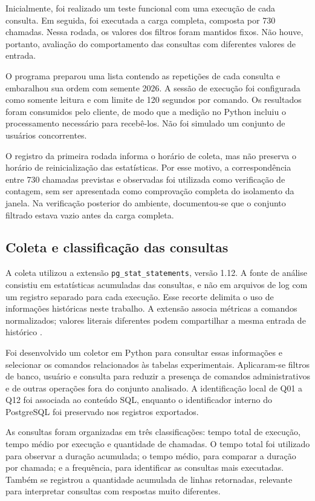 \documentclass{UNESC}
\begin{document}
Inicialmente, foi realizado um teste funcional com uma execução de cada consulta. Em seguida, foi executada a carga completa, composta por 730 chamadas. Nessa rodada, os valores dos filtros foram mantidos fixos. Não houve, portanto, avaliação do comportamento das consultas com diferentes valores de entrada.

O programa preparou uma lista contendo as repetições de cada consulta e embaralhou sua ordem com semente 2026. A sessão de execução foi configurada como somente leitura e com limite de 120 segundos por comando. Os resultados foram consumidos pelo cliente, de modo que a medição no Python incluiu o processamento necessário para recebê-los. Não foi simulado um conjunto de usuários concorrentes.

O registro da primeira rodada informa o horário de coleta, mas não preserva o horário de reinicialização das estatísticas. Por esse motivo, a correspondência entre 730 chamadas previstas e observadas foi utilizada como verificação de contagem, sem ser apresentada como comprovação completa do isolamento da janela. Na verificação posterior do ambiente, documentou-se que o conjunto filtrado estava vazio antes da carga completa.

\subsection{Coleta e classificação das consultas}

A coleta utilizou a extensão \texttt{pg\_stat\_statements}, versão 1.12. A fonte de análise consistiu em estatísticas acumuladas das consultas, e não em arquivos de log com um registro separado para cada execução. Esse recorte delimita o uso de informações históricas neste trabalho. A extensão associa métricas a comandos normalizados; valores literais diferentes podem compartilhar a mesma entrada de histórico \cite{postgresql2026pgstat}.

Foi desenvolvido um coletor em Python para consultar essas informações e selecionar os comandos relacionados às tabelas experimentais. Aplicaram-se filtros de banco, usuário e consulta para reduzir a presença de comandos administrativos e de outras operações fora do conjunto analisado. A identificação local de Q01 a Q12 foi associada ao conteúdo SQL, enquanto o identificador interno do PostgreSQL foi preservado nos registros exportados.

As consultas foram organizadas em três classificações: tempo total de execução, tempo médio por execução e quantidade de chamadas. O tempo total foi utilizado para observar a duração acumulada; o tempo médio, para comparar a duração por chamada; e a frequência, para identificar as consultas mais executadas. Também se registrou a quantidade acumulada de linhas retornadas, relevante para interpretar consultas com respostas muito diferentes.
\end{document}
